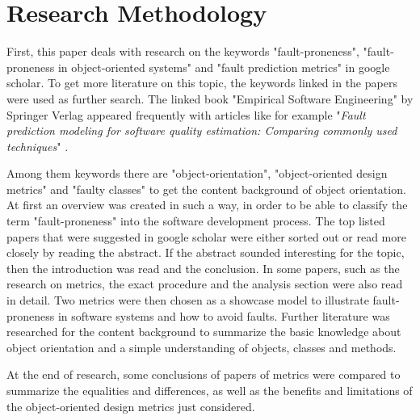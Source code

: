 \section{Research Methodology}\label{research}

First, this paper deals with research on the keywords "fault-proneness", "fault-proneness in object-oriented systems" and "fault prediction metrics" in google scholar. To get more literature on this topic, the keywords linked in the papers were used as further search. The linked book "Empirical Software Engineering" by Springer Verlag appeared frequently with articles like for example "\textit{Fault prediction modeling for software quality estimation: Comparing commonly used techniques}" \cite{khoshgoftaar2003fault}. 

Among them keywords there are "object-orientation", "object-oriented design metrics" and "faulty classes" to get the content background of object orientation. At first an overview was created in such a way, in order to be able to classify the term "fault-proneness" into the software development process. The top listed papers that were suggested in google scholar were either sorted out or read more closely by reading the abstract. If the abstract sounded interesting for the topic, then the introduction was read and the conclusion. In some papers, such as the research on metrics, the exact procedure and the analysis section were also read in detail. Two metrics were then chosen as a showcase model to illustrate fault-proneness in software systems and how to avoid faults. Further literature was researched for the content background to summarize the basic knowledge about object orientation and a simple understanding of objects, classes and methods. 

At the end of research, some conclusions of papers of metrics were compared to summarize the equalities and differences, as well as the benefits and limitations of the object-oriented design metrics just considered.



